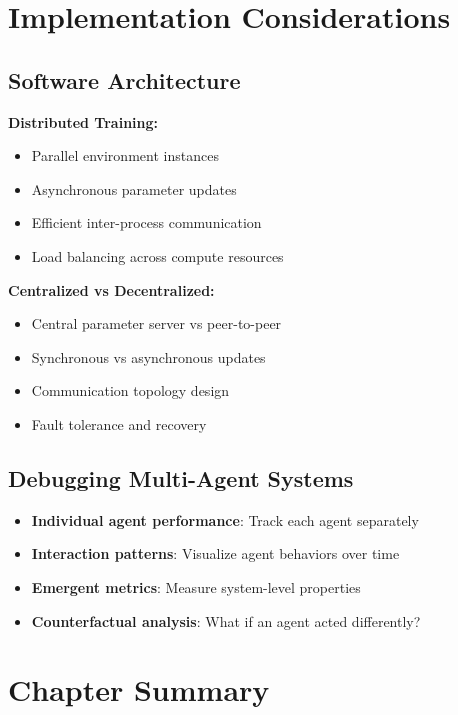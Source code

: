 \section{Implementation Considerations}

\subsection{Software Architecture}

\textbf{Distributed Training:}
\begin{itemize}
    \item Parallel environment instances
    \item Asynchronous parameter updates
    \item Efficient inter-process communication
    \item Load balancing across compute resources
\end{itemize}

\textbf{Centralized vs Decentralized:}
\begin{itemize}
    \item Central parameter server vs peer-to-peer
    \item Synchronous vs asynchronous updates
    \item Communication topology design
    \item Fault tolerance and recovery
\end{itemize}

\subsection{Debugging Multi-Agent Systems}

\begin{itemize}
    \item \textbf{Individual agent performance}: Track each agent separately
    \item \textbf{Interaction patterns}: Visualize agent behaviors over time
    \item \textbf{Emergent metrics}: Measure system-level properties
    \item \textbf{Counterfactual analysis}: What if an agent acted differently?
\end{itemize}

\section{Chapter Summary}

